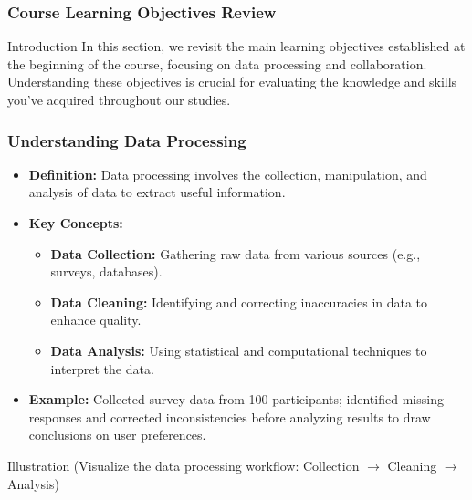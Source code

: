\documentclass[aspectratio=169]{beamer}
\begin{document}
\begin{frame}[fragile]
    \frametitle{Course Learning Objectives Review}
    \begin{block}{Introduction}
        In this section, we revisit the main learning objectives established at the beginning of the course, focusing on data processing and collaboration. Understanding these objectives is crucial for evaluating the knowledge and skills you've acquired throughout our studies.
    \end{block}
\end{frame}

\begin{frame}[fragile]
    \frametitle{Understanding Data Processing}
    \begin{itemize}
        \item \textbf{Definition:} Data processing involves the collection, manipulation, and analysis of data to extract useful information.
        \item \textbf{Key Concepts:}
        \begin{itemize}
            \item \textbf{Data Collection:} Gathering raw data from various sources (e.g., surveys, databases).
            \item \textbf{Data Cleaning:} Identifying and correcting inaccuracies in data to enhance quality.
            \item \textbf{Data Analysis:} Using statistical and computational techniques to interpret the data.
        \end{itemize}
        \item \textbf{Example:} Collected survey data from 100 participants; identified missing responses and corrected inconsistencies before analyzing results to draw conclusions on user preferences.
    \end{itemize}
    \begin{block}{Illustration}
        (Visualize the data processing workflow: Collection $\rightarrow$ Cleaning $\rightarrow$ Analysis)
    \end{block}
\end{frame}
\end{document}
